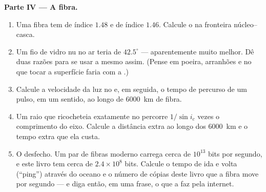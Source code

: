 \begin{problem}
\medskip
\noindent\textbf{Parte IV --- A fibra.}
\begin{enumerate}[resume]
  \item Uma fibra tem  de índice $1.48$ e  de índice $1.46$.
        Calcule o  na fronteira núcleo--casca.
  \item Um fio de vidro nu no ar teria  de $42.5^\circ$ ---
        aparentemente muito melhor. Dê duas razões para se usar a 
        mesmo assim. (Pense em poeira, arranhões e no que tocar a
        superfície faria com a .)
  \item Calcule a velocidade da luz no  e, em seguida, o tempo de
        percurso de um pulso, em um sentido, ao longo de \qty{6000}{km}
        de fibra.
  \item Um raio que ricocheteia exatamente no  percorre
        $1/\sin i_c$ vezes o comprimento do eixo. Calcule a distância
        extra ao longo dos \qty{6000}{km} e o tempo extra que ela custa.
  \item O desfecho. Um par de fibras moderno carrega cerca de $10^{13}$
        bits por segundo, e este livro tem cerca de $2.4 \times 10^8$
        bits. Calcule o tempo de ida e volta (``ping'') através do oceano
        e o número de cópias deste livro que a fibra move por segundo ---
        e diga então, em uma frase, o que a  faz pela
        internet.
\end{enumerate}
\end{problem}
